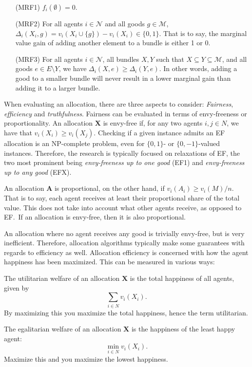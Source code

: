 \begin{enumerate}[align=left]
  \item [(MRF1)] $f_i(\emptyset) = 0$.
  \item [(MRF2)] For all agents $i \in \mathcal{N}$ and all goods $g \in \mathcal{M}$, $\Delta_i(X_i, g) = v_i(X_i \cup \{ g \}) - v_i(X_i) \in \{ 0,1 \}$. That is to say, the marginal value gain of adding another element to a bundle is either 1 or 0.
  \item [(MRF3)] For all agents $i \in \mathcal{N}$, all bundles $X, Y$ such that $X \subseteq Y \subseteq \mathcal{M}$, and all goods $e \in E \setminus Y$, we have $\Delta_i(X, e) \geq \Delta_i(Y, e)$. In other words, adding a good to a smaller bundle will never result in a lower marginal gain than adding it to a larger bundle.
\end{enumerate}

When evaluating an allocation, there are three aspects to consider: \textit{Fairness}, \textit{efficiency} and \textit{truthfulness}. Fairness can be evaluated in terms of envy-freeness or proportionality. An allocation $\textbf{X}$ is envy-free if, for any two agents $i, j \in N$, we have that $v_i(X_i) \geq v_i(X_j)$. Checking if a given instance admits an EF allocation is an NP-complete problem, even for $\{0, 1\}$- or $\{0, -1\}$-valued instances. Therefore, the research is typically focused on relaxations of EF, the two most prominent being \textit{envy-freeness up to one good} (EF1) and \textit{envy-freeness up to any good} (EFX).

An allocation $\textbf{A}$ is proportional, on the other hand, if $v_i(A_i) \geq v_i(M) / n$. That is to say, each agent receives at least their proportional share of the total value. This does not take into account what other agents receive, as opposed to EF.\ If an allocation is envy-free, then it is also proportional.

An allocation where no agent receives any good is trivially envy-free, but is very inefficient. Therefore, allocation algorithms typically make some guarantees with regards to efficiency as well. Allocation efficiency is concerned with how the agent happiness has been maximized. This can be measured in various ways:

The utilitarian welfare of an allocation $\textbf{X}$ is the total happiness of all agents, given by \[\sum_{i \in N} v_i(X_i).\] By maximizing this you maximize the total happiness, hence the term utilitarian.

The egalitarian welfare of an allocation $\textbf{X}$ is the happiness of the least happy agent: \[\min_{i \in N} v_i(X_i).\] Maximize this and you maximize the lowest happiness.

